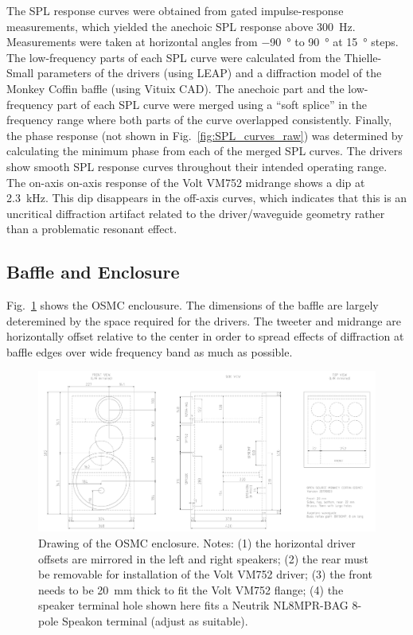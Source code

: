 \documentclass[12pt,a4paper]{article}
\providecommand{\figr}[1]{Fig.~\ref{fig:#1}}
\providecommand{\figlabel}[1]{\label{fig:#1}}
\begin{document}
The SPL response curves were obtained from gated impulse-response measurements, which yielded the anechoic SPL response above \SI{300}{Hz}. Measurements were taken at horizontal angles from \SI{-90}{\degree} to \SI{+90}{\degree} at \SI{15}{\degree} steps. The low-frequency parts of each SPL curve were calculated from the Thielle-Small parameters of the drivers (using LEAP) and a diffraction model of the Monkey Coffin baffle (using Vituix CAD).\cite{osmc_p555} The anechoic part and the low-frequency part of each SPL curve were merged using a ``soft splice'' in the frequency range where both parts of the curve overlapped consistently\cite{osmc_p568}. Finally, the phase response (not shown in \figr{SPL_curves_raw}) was determined by calculating the minimum phase from each of the merged SPL curves. The drivers show smooth SPL response curves throughout their intended operating range. The on-axis on-axis response of the Volt VM752 midrange shows a dip at \SI{2.3}{kHz}. This dip disappears in the off-axis curves, which indicates that this is an uncritical diffraction artifact related to the driver/waveguide geometry rather than a problematic resonant effect.\par


\subsection{Baffle and Enclosure}

\figr{osmc_enclosure} shows the OSMC enclousure. The dimensions of the baffle are largely deteremined by the space required for the drivers. The tweeter and midrange are horizontally offset relative to the center in order to spread effects of diffraction at baffle edges over wide frequency band as much as possible.

\begin{figure}[tbp]
	\centering
	\includegraphics[width=\textwidth]{osmc_enclosure_20190823.pdf}
	\caption{Drawing of the OSMC enclosure. Notes: (1) the horizontal driver offsets are mirrored in the left and right speakers; (2) the rear must be removable for installation of the Volt VM752 driver; (3) the front needs to be \SI{20}{mm} thick to fit the Volt VM752 flange; (4) the speaker terminal hole shown here fits a Neutrik NL8MPR-BAG 8-pole Speakon terminal (adjust as suitable).}
	\figlabel{osmc_enclosure}
\end{figure}
\end{document}

